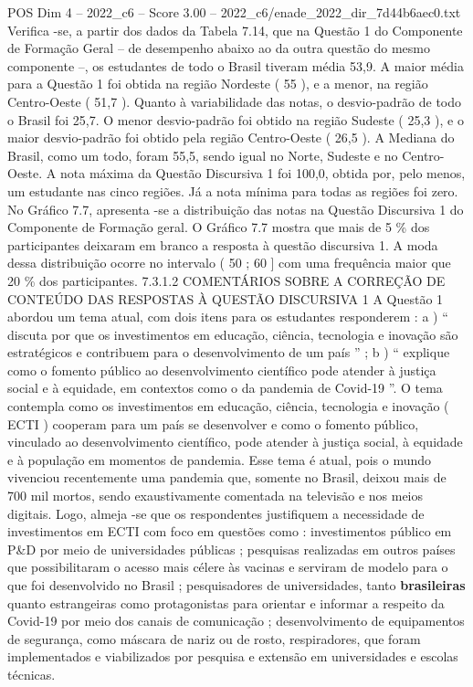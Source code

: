 \begin{textsample}{POS Dim 4 – 2022\_c6 – Score 3.00 – 2022\_c6/enade\_2022\_dir\_7d44b6aec0.txt}
Verifica -se, a partir dos dados da Tabela 7.14, que na Questão 1 do Componente de Formação Geral – de desempenho abaixo ao da outra questão do mesmo componente –, os estudantes de todo o Brasil tiveram média 53,9.
A maior média para a Questão 1 foi obtida na região Nordeste ( 55 ), e a menor, na região Centro-Oeste ( 51,7 ).
Quanto à variabilidade das notas, o desvio-padrão de todo o Brasil foi 25,7.
O menor desvio-padrão foi obtido na região Sudeste ( 25,3 ), e o maior desvio-padrão foi obtido pela região Centro-Oeste ( 26,5 ).
A Mediana do Brasil, como um todo, foram 55,5, sendo igual no Norte, Sudeste e no Centro-Oeste.
A nota máxima da Questão Discursiva 1 foi 100,0, obtida por, pelo menos, um estudante nas cinco regiões.
Já a nota mínima para todas as regiões foi zero.
No Gráfico 7.7, apresenta -se a distribuição das notas na Questão Discursiva 1 do Componente de Formação geral.
O Gráfico 7.7 mostra que mais de 5 \% dos participantes deixaram em branco a resposta à questão discursiva 1.
A moda dessa distribuição ocorre no intervalo ( 50 ; 60 ] com uma frequência maior que 20 \% dos participantes. 7.3.1.2 COMENTÁRIOS SOBRE A CORREÇÃO DE CONTEÚDO DAS RESPOSTAS À QUESTÃO DISCURSIVA 1 A Questão 1 abordou um tema atual, com dois itens para os estudantes responderem : a ) “ discuta por que os investimentos em educação, ciência, tecnologia e inovação são estratégicos e contribuem para o desenvolvimento de um país ” ; b ) “ explique como o fomento público ao desenvolvimento científico pode atender à justiça social e à equidade, em contextos como o da pandemia de Covid-19 ”.
O tema contempla como os investimentos em educação, ciência, tecnologia e inovação ( ECTI ) cooperam para um país se desenvolver e como o fomento público, vinculado ao desenvolvimento científico, pode atender à justiça social, à equidade e à população em momentos de pandemia.
Esse tema é atual, pois o mundo vivenciou recentemente uma pandemia que, somente no Brasil, deixou mais de 700 mil mortos, sendo exaustivamente comentada na televisão e nos meios digitais.
Logo, almeja -se que os respondentes justifiquem a necessidade de investimentos em ECTI com foco em questões como : investimentos público em P\&D por meio de universidades públicas ; pesquisas realizadas em outros países que possibilitaram o acesso mais célere às vacinas e serviram de modelo para o que foi desenvolvido no Brasil ; pesquisadores de universidades, tanto \textbf{brasileiras} quanto estrangeiras como protagonistas para orientar e informar a respeito da Covid-19 por meio dos canais de comunicação ; desenvolvimento de equipamentos de segurança, como máscara de nariz ou de rosto, respiradores, que foram implementados e viabilizados por pesquisa e extensão em universidades e escolas técnicas.

\end{textsample}
